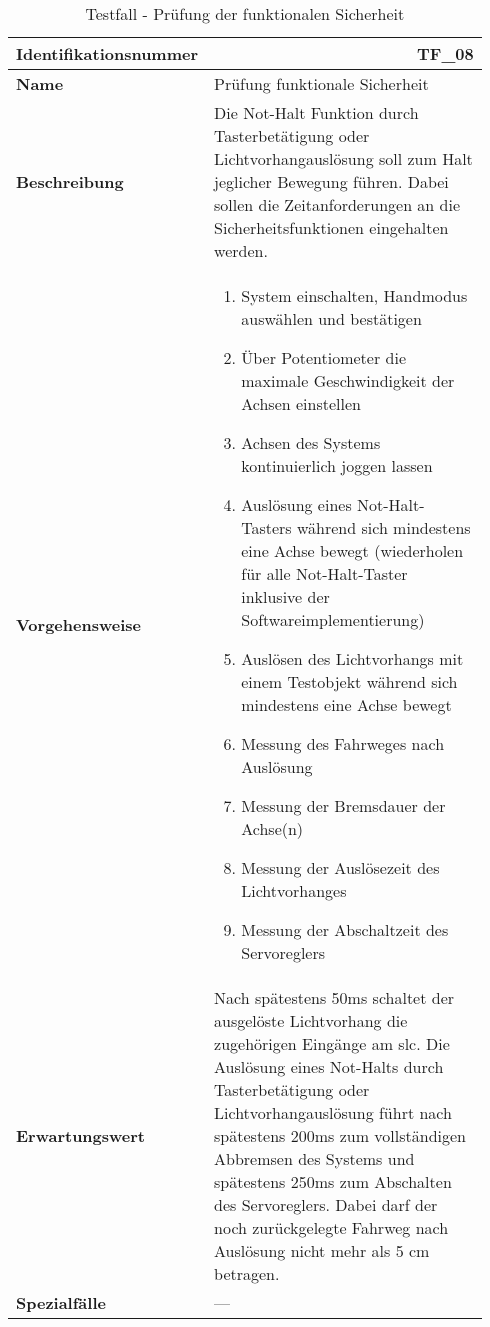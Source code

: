 \documentclass[../../../Bachelorarbeit.tex]{subfiles}
\begin{document}
\begin{table}[H]
    \centering
    \begin{tabular}{ p{0.34\linewidth}  p{0.6\linewidth} }
        \hline
        \textbf{Identifikationsnummer}  & \multicolumn{1}{r}{TF\_08} \\ \hline
        \textbf{Name}                   & Prüfung funktionale Sicherheit \\
        \textbf{Beschreibung}           & Die Not-Halt Funktion durch Tasterbetätigung oder Lichtvorhangauslösung soll zum Halt jeglicher Bewegung führen. Dabei sollen die Zeitanforderungen an die Sicherheitsfunktionen eingehalten werden. \\
        \textbf{Vorgehensweise}         &   {\begin{enumerate}[noitemsep,topsep=0pt,parsep=0pt,partopsep=0pt,leftmargin=*]
                                                \item System einschalten, Handmodus auswählen und bestätigen
                                                \item Über Potentiometer die maximale Geschwindigkeit der Achsen einstellen
                                                \item Achsen des Systems kontinuierlich joggen lassen
                                                \item Auslösung eines Not-Halt-Tasters während sich mindestens eine Achse bewegt (wiederholen für alle Not-Halt-Taster inklusive der Softwareimplementierung)
                                                \item Auslösen des Lichtvorhangs mit einem Testobjekt während sich mindestens eine Achse bewegt
                                                \item Messung des Fahrweges nach Auslösung
                                                \item Messung der Bremsdauer der Achse(n)
                                                \item Messung der Auslösezeit des Lichtvorhanges
                                                \item Messung der Abschaltzeit des Servoreglers
                                            \end{enumerate}} \\
        \textbf{Erwartungswert}         & Nach spätestens 50\si{ms} schaltet der ausgelöste Lichtvorhang die zugehörigen Eingänge am \acs{slc}. Die Auslösung eines Not-Halts durch Tasterbetätigung oder Lichtvorhangauslösung führt nach spätestens 200\si{ms} zum vollständigen Abbremsen des Systems und spätestens 250\si{ms} zum Abschalten des Servoreglers. Dabei darf der noch zurückgelegte Fahrweg nach Auslösung nicht mehr als 5 \si{cm} betragen. \\
        \textbf{Spezialfälle}           & --- \\ \hline
    \end{tabular}
    \caption[\acs{tf} - Funktionale Sicherheit]{Testfall - Prüfung der funktionalen Sicherheit}
    \label{tab:my-table67}
\end{table}
\end{document}
